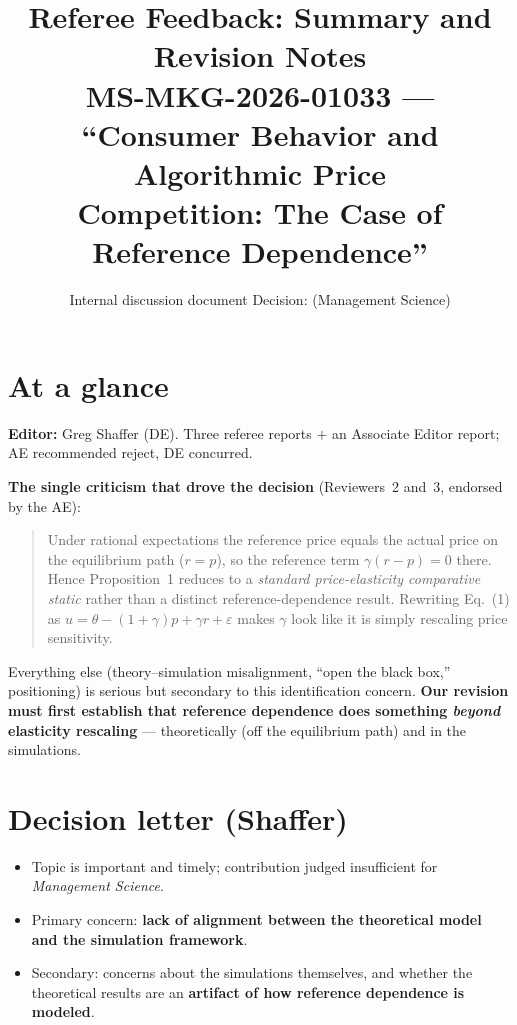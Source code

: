 \documentclass[11pt]{article}
\title{\vspace{-2em}\textbf{Referee Feedback: Summary and Revision Notes}\\[0.3em]
\large MS-MKG-2026-01033 --- ``Consumer Behavior and Algorithmic Price\\ Competition: The Case of Reference Dependence''}
\author{}
\date{Internal discussion document \quad\textbullet\quad Decision: \crit{Reject} (Management Science)}
\newcommand{\crit}[1]{\textcolor{crit}{\textbf{#1}}}
\begin{document}
\maketitle
\vspace{-2.5em}

\section*{At a glance}

\textbf{Editor:} Greg Shaffer (DE). Three referee reports $+$ an Associate Editor report; AE recommended
reject, DE concurred.

\medskip
\noindent\textbf{The single criticism that drove the decision} (Reviewers~2 and~3, endorsed by the AE):

\begin{quote}
Under rational expectations the reference price equals the actual price on the equilibrium path
($r=p$), so the reference term $\gamma(r-p)=0$ there. Hence Proposition~1 reduces to a
\emph{standard price-elasticity comparative static} rather than a distinct reference-dependence
result. Rewriting Eq.~(1) as $u = \theta - (1+\gamma)p + \gamma r + \varepsilon$ makes $\gamma$
look like it is simply rescaling price sensitivity.
\end{quote}

\noindent Everything else (theory--simulation misalignment, ``open the black box,'' positioning) is
serious but secondary to this identification concern. \textbf{Our revision must first establish that
reference dependence does something \emph{beyond} elasticity rescaling} --- theoretically (off the
equilibrium path) and in the simulations.

\section{Decision letter (Shaffer)}

\begin{itemize}
  \item Topic is important and timely; contribution judged insufficient for \emph{Management Science}.
  \item Primary concern: \crit{lack of alignment between the theoretical model and the simulation framework}.
  \item Secondary: concerns about the simulations themselves, and whether the theoretical results are an
        \crit{artifact of how reference dependence is modeled}.
\end{itemize}
\end{document}

